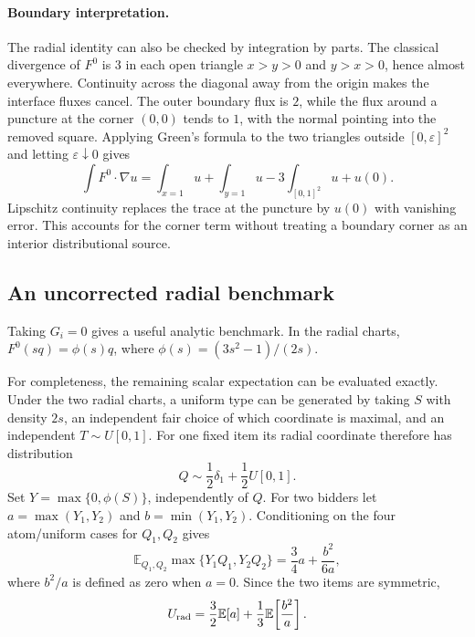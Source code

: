 \documentclass[11pt]{article}
\begin{document}
\paragraph{Boundary interpretation.}
The radial identity can also be checked by integration by parts.  The
classical divergence of \(F^0\) is \(3\) in each open triangle \(x>y>0\) and
\(y>x>0\), hence almost everywhere.  Continuity across the diagonal away
from the origin makes the interface fluxes cancel.  The outer boundary flux
is \(2\), while the flux around a puncture at the corner \((0,0)\) tends to
\(1\), with the normal pointing into the removed square.  Applying Green's
formula to the two triangles outside \([0,\varepsilon]^2\) and letting
\(\varepsilon\downarrow0\) gives
\[
\int F^0\cdot\nabla u
=\int_{x=1}u+\int_{y=1}u-3\int_{[0,1]^2}u+u(0).
\]
Lipschitz continuity replaces the trace at the puncture by \(u(0)\) with
vanishing error.  This accounts for the corner term without treating a
boundary corner as an interior distributional source.

\subsection{An uncorrected radial benchmark}

Taking \(G_i=0\) gives a useful analytic benchmark.  In the radial charts,
\(F^0(sq)=\phi(s)q\), where \(\phi(s)=(3s^2-1)/(2s)\).

For completeness, the remaining scalar expectation can be evaluated exactly.
Under the two radial charts, a uniform type can be generated by taking \(S\)
with density \(2s\), an independent fair choice of which coordinate is
maximal, and an independent \(T\sim U[0,1]\).  For one fixed item its radial
coordinate therefore has distribution
\[
Q\sim\frac12\delta_1+\frac12U[0,1].
\]
Set \(Y=\max\{0,\phi(S)\}\), independently of \(Q\).  For two bidders let
\(a=\max(Y_1,Y_2)\) and \(b=\min(Y_1,Y_2)\).  Conditioning on the four
atom/uniform cases for \(Q_1,Q_2\) gives
\[
\mathbb E_{Q_1,Q_2}\max\{Y_1Q_1,Y_2Q_2\}
=\frac34a+\frac{b^2}{6a},
\]
where \(b^2/a\) is defined as zero when \(a=0\).  Since the two items are
symmetric,
\begin{equation}\label{eq:radial-moments}
U_{\rm rad}
=\frac32\mathbb E[a]+\frac13\mathbb E\!\left[\frac{b^2}{a}\right].
\end{equation}
\end{document}
